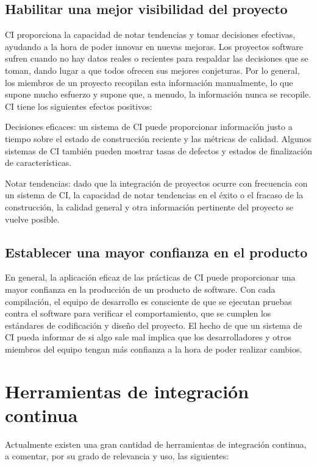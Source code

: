 \subsection{Habilitar una mejor visibilidad del proyecto}
CI proporciona la capacidad de notar tendencias y tomar decisiones efectivas, ayudando a la hora de poder innovar en nuevas mejoras. Los proyectos software sufren cuando no hay datos reales o recientes para respaldar las decisiones que se toman, dando lugar a que todos ofrecen sus mejores conjeturas. Por lo general, los miembros de un proyecto recopilan esta información manualmente, lo que supone mucho esfuerzo y supone que, a menudo, la información nunca se recopile. CI tiene los siguientes efectos positivos:
\begin{compactitem}
    \item Decisiones eficaces: un sistema de CI puede proporcionar información justo a tiempo sobre el estado de construcción reciente y las métricas de calidad. Algunos sistemas de CI también pueden mostrar tasas de defectos y estados de finalización de características.
    \item Notar tendencias: dado que la integración de proyectos ocurre con frecuencia con un sistema de CI, la capacidad de notar tendencias en el éxito o el fracaso de la construcción, la calidad general y otra información pertinente del proyecto se vuelve posible.
\end{compactitem}
\subsection{Establecer una mayor confianza en el producto}
En general, la aplicación eficaz de las prácticas de CI puede proporcionar una mayor confianza en la producción de un producto de software. Con cada compilación, el equipo de desarrollo es consciente de que se ejecutan pruebas contra el software para verificar el comportamiento, que se cumplen los estándares de codificación y diseño del proyecto. El hecho de que un sistema de CI pueda informar de si algo sale mal implica que los desarrolladores y otros miembros del equipo tengan más confianza a la hora de poder realizar cambios.

\section{Herramientas de integración continua}
Actualmente existen una gran cantidad de herramientas de integración continua, a comentar, por su grado de relevancia y uso, las siguientes:
